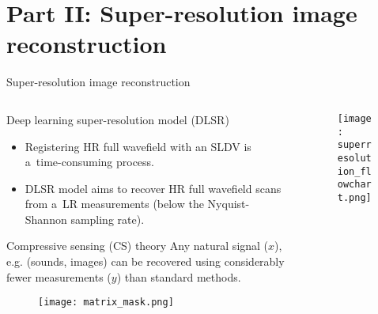 \documentclass[10pt,aspectratio=169,dvipsnames]{beamer} %
\begin{document}
	\section{Part II: Super-resolution image reconstruction}
	\begin{frame}{Super-resolution image reconstruction}
		\begin{columns}[T]
			\begin{column}[t]{0.6\textwidth}
				\begin{alertblock}{Deep learning super-resolution model (DLSR)}					
					\begin{footnotesize}
						\justifying
						\addtolength{\leftmargini}{\labelsep}
						\begin{itemize}
							\item Registering HR full wavefield with an SLDV is a~time-consuming process.
							\item DLSR model aims to recover HR full wavefield scans from a~LR measurements (below the Nyquist-Shannon sampling rate).
						\end{itemize} 
					\end{footnotesize}					
				\end{alertblock}						
				\begin{exampleblock}{Compressive sensing (CS) theory}
					\footnotesize
					\justifying
					Any natural signal (\(x\)), e.g. (sounds, images) can be recovered using considerably fewer measurements (\(y\)) than standard methods.
					\vfill
					\begin{figure}[ht!]
					\centering
					\texttt{[image: matrix\_mask.png]}
					\end{figure}
				\end{exampleblock}							
			\end{column}
			\begin{column}[t]{0.4\textwidth}
				\begin{figure}[ht!]
					\centering
					\texttt{[image: superresolution\_flowchart.png]}
				\end{figure}
			\end{column}
		\end{columns}		
	\end{frame}
\end{document}
